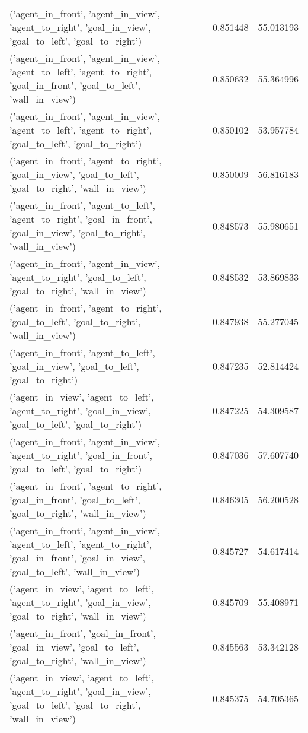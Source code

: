 \begin{tabular}{lrr}
('agent\_in\_front', 'agent\_in\_view', 'agent\_to\_right', 'goal\_in\_view', 'goal\_to\_left', 'goal\_to\_right') & 0.851448 & 55.013193 \\
('agent\_in\_front', 'agent\_in\_view', 'agent\_to\_left', 'agent\_to\_right', 'goal\_in\_front', 'goal\_to\_left', 'wall\_in\_view') & 0.850632 & 55.364996 \\
('agent\_in\_front', 'agent\_in\_view', 'agent\_to\_left', 'agent\_to\_right', 'goal\_to\_left', 'goal\_to\_right') & 0.850102 & 53.957784 \\
('agent\_in\_front', 'agent\_to\_right', 'goal\_in\_view', 'goal\_to\_left', 'goal\_to\_right', 'wall\_in\_view') & 0.850009 & 56.816183 \\
('agent\_in\_front', 'agent\_to\_left', 'agent\_to\_right', 'goal\_in\_front', 'goal\_in\_view', 'goal\_to\_right', 'wall\_in\_view') & 0.848573 & 55.980651 \\
('agent\_in\_front', 'agent\_in\_view', 'agent\_to\_right', 'goal\_to\_left', 'goal\_to\_right', 'wall\_in\_view') & 0.848532 & 53.869833 \\
('agent\_in\_front', 'agent\_to\_right', 'goal\_to\_left', 'goal\_to\_right', 'wall\_in\_view') & 0.847938 & 55.277045 \\
('agent\_in\_front', 'agent\_to\_left', 'goal\_in\_view', 'goal\_to\_left', 'goal\_to\_right') & 0.847235 & 52.814424 \\
('agent\_in\_view', 'agent\_to\_left', 'agent\_to\_right', 'goal\_in\_view', 'goal\_to\_left', 'goal\_to\_right') & 0.847225 & 54.309587 \\
('agent\_in\_front', 'agent\_in\_view', 'agent\_to\_right', 'goal\_in\_front', 'goal\_to\_left', 'goal\_to\_right') & 0.847036 & 57.607740 \\
('agent\_in\_front', 'agent\_to\_right', 'goal\_in\_front', 'goal\_to\_left', 'goal\_to\_right', 'wall\_in\_view') & 0.846305 & 56.200528 \\
('agent\_in\_front', 'agent\_in\_view', 'agent\_to\_left', 'agent\_to\_right', 'goal\_in\_front', 'goal\_in\_view', 'goal\_to\_left', 'wall\_in\_view') & 0.845727 & 54.617414 \\
('agent\_in\_view', 'agent\_to\_left', 'agent\_to\_right', 'goal\_in\_view', 'goal\_to\_right', 'wall\_in\_view') & 0.845709 & 55.408971 \\
('agent\_in\_front', 'goal\_in\_front', 'goal\_in\_view', 'goal\_to\_left', 'goal\_to\_right', 'wall\_in\_view') & 0.845563 & 53.342128 \\
('agent\_in\_view', 'agent\_to\_left', 'agent\_to\_right', 'goal\_in\_view', 'goal\_to\_left', 'goal\_to\_right', 'wall\_in\_view') & 0.845375 & 54.705365 \\

\end{tabular}
